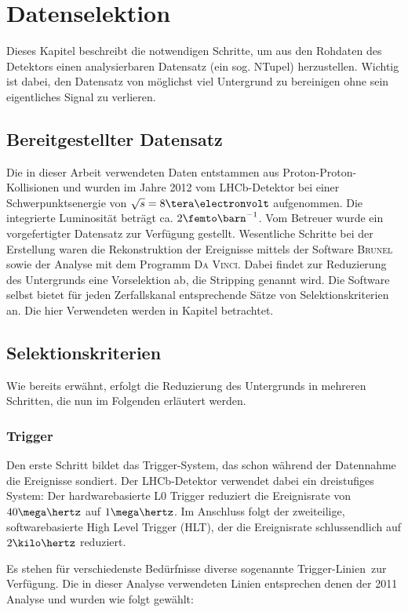 \chapter{Datenselektion}
Dieses Kapitel beschreibt die notwendigen Schritte, um aus den Rohdaten des Detektors einen analysierbaren Datensatz (ein sog. NTupel) herzustellen. Wichtig ist dabei, den Datensatz von möglichst viel Untergrund zu bereinigen ohne sein eigentliches Signal zu verlieren.

\section{Bereitgestellter Datensatz}
Die in dieser Arbeit verwendeten Daten entstammen aus Proton-Proton-Kollisionen und wurden im Jahre 2012 vom LHCb-Detektor bei einer Schwerpunktsenergie von $\sqrt{s} = 8\tera\electronvolt$ aufgenommen. Die integrierte Luminosität beträgt ca. $2\femto\barn^{-1}$. Vom Betreuer wurde ein vorgefertigter Datensatz zur Verfügung gestellt. Wesentliche Schritte bei der Erstellung waren die Rekonstruktion der Ereignisse mittels der Software \textsc{Brunel} sowie der Analyse mit dem Programm \textsc{Da Vinci}. Dabei findet zur Reduzierung des Untergrunds eine Vorselektion ab, die Stripping genannt wird. Die Software selbst bietet für jeden Zerfallskanal entsprechende Sätze von Selektionskriterien an. Die hier Verwendeten werden in Kapitel \label{kap:stripping} betrachtet.


\section{Selektionskriterien}
Wie bereits erwähnt, erfolgt die Reduzierung des Untergrunds in mehreren Schritten, die nun im Folgenden erläutert werden.

\subsection{Trigger} \label{kap:trigger}
Den erste Schritt bildet das Trigger-System, das schon während der Datennahme die Ereignisse sondiert. Der LHCb-Detektor verwendet dabei ein dreistufiges System: Der hardwarebasierte \glqq L0 Trigger \grqq reduziert die Ereignisrate von $40\mega\hertz$ auf $1\mega\hertz$. Im Anschluss folgt der zweiteilige, softwarebasierte \glqq High Level Trigger \grqq (HLT), der die Ereignisrate schlussendlich auf $2\kilo\hertz$ reduziert.\cite{trigger} 

Es stehen für verschiedenste Bedürfnisse diverse sogenannte \glqq Trigger-Linien\grqq\ zur Verfügung. Die in dieser Analyse verwendeten Linien entsprechen denen der 2011 Analyse \cite{lhcb-paper} und wurden wie folgt gewählt:

